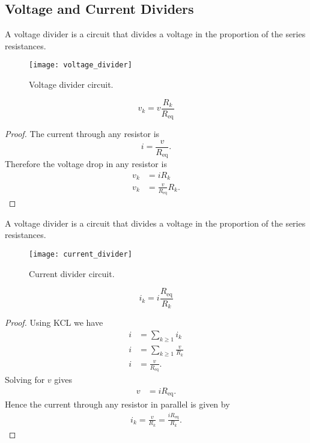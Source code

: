 \documentclass{article}
\begin{document}
\subsection{Voltage and Current Dividers}
\begin{definition}
    A voltage divider is a circuit that divides a voltage in the proportion of the series resistances.
\end{definition}
\begin{figure}[H]
    \centering
    \texttt{[image: voltage\_divider]}
    \caption{Voltage divider circuit.}
\end{figure}
\begin{theorem}
    \begin{equation*}
        v_k = v \frac{R_k}{R_{\mathrm{eq}}}
    \end{equation*}
\end{theorem}
\begin{proof}
    The current through any resistor is
    \begin{equation*}
        i = \frac{v}{R_{\mathrm{eq}}}.
    \end{equation*}
    Therefore the voltage drop in any resistor is
    \begin{align*}
        v_k & = i R_k                          \\
        v_k & = \frac{v}{R_{\mathrm{eq}}} R_k.
    \end{align*}
\end{proof}
\begin{definition}
    A voltage divider is a circuit that divides a voltage in the proportion of the series resistances.
\end{definition}
\begin{figure}[H]
    \centering
    \texttt{[image: current\_divider]}
    \caption{Current divider circuit.}
\end{figure}
\begin{theorem}
    \begin{equation*}
        i_k = i \frac{R_{\mathrm{eq}}}{R_k}
    \end{equation*}
\end{theorem}
\begin{proof}
    Using KCL we have
    \begin{align*}
        i & = \sum_{k\geq1} i_k           \\
        i & = \sum_{k\geq1} \frac{v}{R_k} \\
        i & = \frac{v}{R_{\mathrm{eq}}}.
    \end{align*}
    Solving for $v$ gives
    \begin{align*}
        v & = i R_{\mathrm{eq}}.
    \end{align*}
    Hence the current through any resistor in parallel is given by
    \begin{align*}
        i_k = \frac{v}{R_k} = \frac{iR_{\mathrm{eq}}}{R_k}.
    \end{align*}
\end{proof}
\newpage
\end{document}
